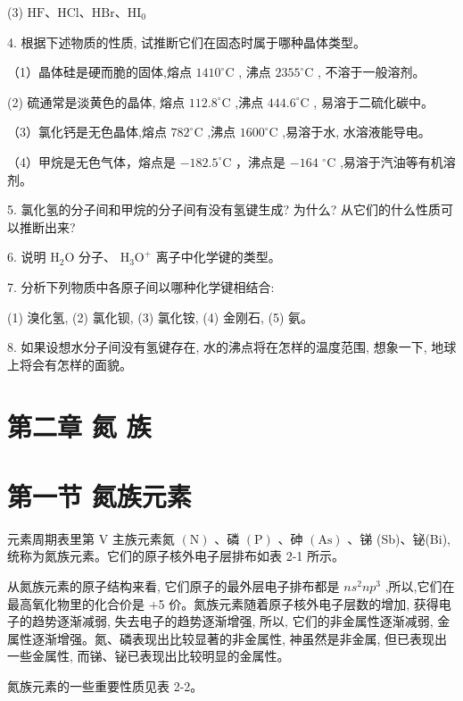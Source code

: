 \documentclass[10pt]{article}
\begin{document}
(3) \(\mathrm{{HF}}\text{、}\mathrm{{HCl}}\text{、}\mathrm{{HBr}}\text{、}{\mathrm{{HI}}}_{0}\)

4. 根据下述物质的性质, 试推断它们在固态时属于哪种晶体类型。

（1）晶体硅是硬而脆的固体,熔点 \({1410}^{ \circ }\mathrm{C}\) , 沸点 \({2355}^{ \circ }\mathrm{C}\) , 不溶于一般溶剂。

(2) 硫通常是淡黄色的晶体, 熔点 \({112.8}^{ \circ }\mathrm{C}\) ,沸点 \({444.6}^{ \circ }\mathrm{C}\) , 易溶于二硫化碳中。

（3）氯化钙是无色晶体,熔点 \({782}^{ \circ }\mathrm{C}\) ,沸点 \({1600}^{ \circ }\mathrm{C}\) ,易溶于水, 水溶液能导电。

（4）甲烷是无色气体，熔点是 \(- {182.5}^{ \circ }\mathrm{C}\) ，沸点是 \(- {164}\) \({}^{ \circ }\mathrm{C}\) ,易溶于汽油等有机溶剂。

5. 氯化氢的分子间和甲烷的分子间有没有氢键生成? 为什么? 从它们的什么性质可以推断出来?

6. 说明 \({\mathrm{H}}_{2}\mathrm{O}\) 分子、 \({\mathrm{H}}_{3}{\mathrm{O}}^{ + }\) 离子中化学键的类型。

7. 分析下列物质中各原子间以哪种化学键相结合:

(1) 溴化氢, (2) 氯化钡, (3) 氯化铵, (4) 金刚石, (5) 氨。

8. 如果设想水分子间没有氢键存在, 水的沸点将在怎样的温度范围, 想象一下, 地球上将会有怎样的面貌。

\section*{第二章 氮 族}

\section*{第一节 氮族元素}

元素周期表里第 \(\mathrm{V}\) 主族元素氮 \(\left( \mathrm{N}\right)\) 、磷 \(\left( \mathrm{P}\right)\) 、砷 \(\left( \mathrm{{As}}\right)\) 、锑 (Sb)、铋(Bi), 统称为氮族元素。它们的原子核外电子层排布如表 2-1 所示。

从氮族元素的原子结构来看, 它们原子的最外层电子排布都是 \(n{s}^{2}n{p}^{3}\) ,所以,它们在最高氧化物里的化合价是 +5 价。氮族元素随着原子核外电子层数的增加, 获得电子的趋势逐渐减弱, 失去电子的趋势逐渐增强, 所以, 它们的非金属性逐渐减弱, 金属性逐渐增强。氮、磷表现出比较显著的非金属性, 神虽然是非金属, 但已表现出一些金属性, 而锑、铋已表现出比较明显的金属性。

氮族元素的一些重要性质见表 2-2。
\end{document}
